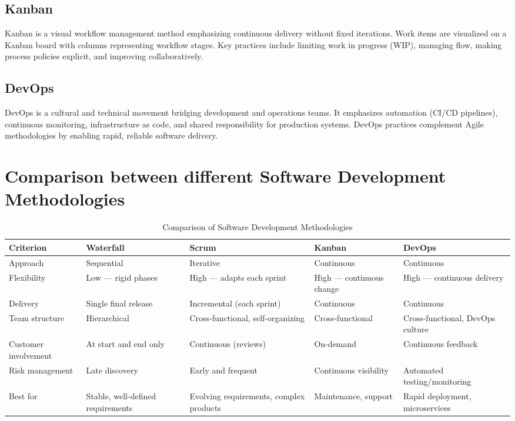\documentclass[12pt,a4paper]{report}
\begin{document}
\subsection{Kanban}
Kanban is a visual workflow management method emphasizing continuous delivery without fixed iterations. Work items are visualized on a Kanban board with columns representing workflow stages. Key practices include limiting work in progress (WIP), managing flow, making process policies explicit, and improving collaboratively.

\subsection{DevOps}
DevOps is a cultural and technical movement bridging development and operations teams. It emphasizes automation (CI/CD pipelines), continuous monitoring, infrastructure as code, and shared responsibility for production systems. DevOps practices complement Agile methodologies by enabling rapid, reliable software delivery.

\section{Comparison between different Software Development Methodologies}

\begin{table}[H]
\centering
\caption{Comparison of Software Development Methodologies}
\label{tab:methodology-comparison}
\begin{tabularx}{\textwidth}{|l|X|X|X|X|}
\hline
\textbf{Criterion} & \textbf{Waterfall} & \textbf{Scrum} & \textbf{Kanban} & \textbf{DevOps} \\
\hline
Approach & Sequential & Iterative & Continuous & Continuous \\
\hline
Flexibility & Low — rigid phases & High — adapts each sprint & High — continuous change & High — continuous delivery \\
\hline
Delivery & Single final release & Incremental (each sprint) & Continuous & Continuous \\
\hline
Team structure & Hierarchical & Cross-functional, self-organizing & Cross-functional & Cross-functional, DevOps culture \\
\hline
Customer involvement & At start and end only & Continuous (reviews) & On-demand & Continuous feedback \\
\hline
Risk management & Late discovery & Early and frequent & Continuous visibility & Automated testing/monitoring \\
\hline
Best for & Stable, well-defined requirements & Evolving requirements, complex products & Maintenance, support & Rapid deployment, microservices \\
\hline
\end{tabularx}
\end{table}
\end{document}
